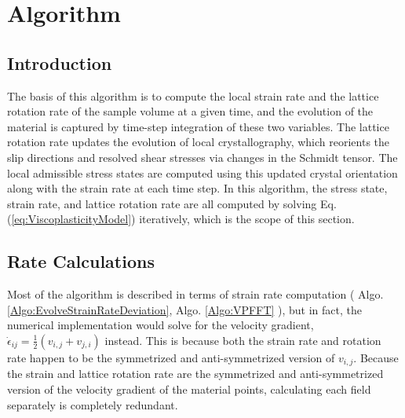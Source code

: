 \documentclass[11pt]{article}
\newcommand{\RefEq}[1] {Eq. (\ref{#1})}
\newcommand{\RefAlgo}[1]{Algo. \ref{#1}}
\begin{document}

\section{Algorithm}

\subsection{Introduction}

The basis of this algorithm is to compute the local strain rate and the lattice rotation rate of the sample volume at a given time, and the evolution of the material is captured by time-step integration of these two variables.  The lattice rotation rate updates the evolution of local crystallography, which reorients the slip directions and resolved shear stresses via changes in the Schmidt tensor.  The local admissible stress states are computed using this updated crystal orientation along with the strain rate at each time step.  In this algorithm, the stress state, strain rate, and lattice rotation rate are all computed by solving \RefEq{eq:ViscoplasticityModel} iteratively, which is the scope of this section.


\subsection{Rate Calculations}

Most of the algorithm is described in terms of strain rate computation ( \RefAlgo{Algo:EvolveStrainRateDeviation}, \RefAlgo{Algo:VPFFT} ), but in fact, the numerical implementation would solve for the velocity gradient,  $\dot{\epsilon}_{ij} = \frac{1}{2}( v_{i,j} + v_{j,i})$ instead.  This is because both the strain rate and rotation rate happen to be the symmetrized and anti-symmetrized  version of $v_{i,j}$. Because the strain and lattice rotation rate are the symmetrized and anti-symmetrized version of the velocity gradient of the material points, calculating each field separately is completely redundant.  
\end{document}
